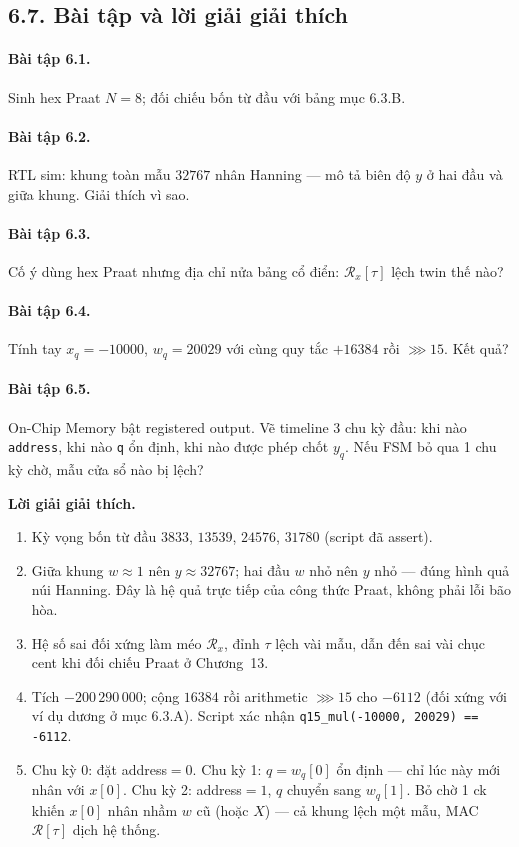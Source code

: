 \subsection*{6.7. Bài tập và lời giải giải thích}

\paragraph{Bài tập 6.1.} Sinh hex Praat $N=8$; đối chiếu bốn từ đầu với bảng mục 6.3.B.

\paragraph{Bài tập 6.2.} RTL sim: khung toàn mẫu $32767$ nhân Hanning --- mô tả biên độ $y$ ở hai đầu và giữa khung. Giải thích vì sao.

\paragraph{Bài tập 6.3.} Cố ý dùng hex Praat nhưng địa chỉ nửa bảng cổ điển: $\mathcal{R}_x[\tau]$ lệch twin thế nào?

\paragraph{Bài tập 6.4.} Tính tay $x_q = -10000$, $w_q = 20029$ với cùng quy tắc $+16384$ rồi $\ggg 15$. Kết quả?

\paragraph{Bài tập 6.5.} On-Chip Memory bật registered output. Vẽ timeline 3 chu kỳ đầu: khi nào \texttt{address}, khi nào \texttt{q} ổn định, khi nào được phép chốt $y_q$. Nếu FSM bỏ qua 1 chu kỳ chờ, mẫu cửa sổ nào bị lệch?

\noindent\textbf{Lời giải giải thích.}
\begin{enumerate}[leftmargin=1.4em]
\item Kỳ vọng bốn từ đầu $3833$, $13539$, $24576$, $31780$ (script đã assert).
\item Giữa khung $w\approx 1$ nên $y\approx 32767$; hai đầu $w$ nhỏ nên $y$ nhỏ --- đúng hình quả núi Hanning. Đây là hệ quả trực tiếp của công thức Praat, không phải lỗi bão hòa.
\item Hệ số sai đối xứng làm méo $\mathcal{R}_x$, đỉnh $\tau$ lệch vài mẫu, dẫn đến sai vài chục cent khi đối chiếu Praat ở Chương~13.
\item Tích $-200\,290\,000$; cộng $16384$ rồi arithmetic $\ggg 15$ cho $-6112$ (đối xứng với ví dụ dương ở mục 6.3.A). Script xác nhận \texttt{q15\_mul(-10000, 20029) == -6112}.
\item Chu kỳ 0: đặt address$=0$. Chu kỳ 1: $q=w_q[0]$ ổn định --- chỉ lúc này mới nhân với $x[0]$. Chu kỳ 2: address$=1$, $q$ chuyển sang $w_q[1]$. Bỏ chờ 1 ck khiến $x[0]$ nhân nhầm $w$ cũ (hoặc $X$) --- cả khung lệch một mẫu, MAC $\mathcal{R}[\tau]$ dịch hệ thống.
\end{enumerate}
